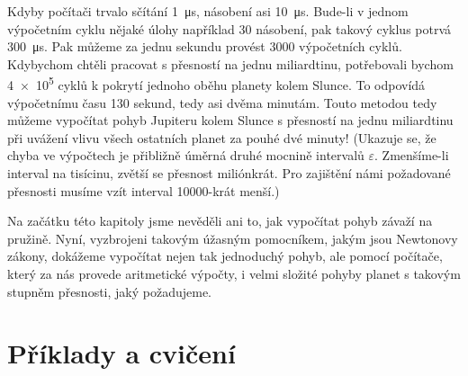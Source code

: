     Kdyby počítači trvalo sčítání \SI{1}{\us}, násobení asi \SI{10}{\us}. Bude-li v 
    jednom výpočetním cyklu nějaké úlohy například \num{30} násobení, pak takový cyklus potrvá 
    \SI{300}{\us}. Pak můžeme za jednu sekundu provést \num{3000} výpočetních cyklů. Kdybychom 
    chtěli pracovat s přesností na jednu miliardtinu, potřebovali bychom \num{4e5} cyklů k pokrytí 
    jednoho oběhu planety kolem Slunce. To odpovídá výpočetnímu času 130 sekund, tedy asi dvěma 
    minutám. Touto metodou tedy můžeme vypočítat pohyb Jupiteru kolem Slunce s přesností na 
    jednu miliardtinu při uvážení vlivu všech ostatních planet za pouhé dvé minuty! (Ukazuje se, že 
    chyba ve výpočtech je přibližně úměrná druhé mocnině intervalů \(\varepsilon\). Zmenšíme-li 
    interval na tisícinu, zvětší se přesnost miliónkrát. Pro zajištění námi požadované přesnosti 
    musíme vzít interval \num{10000}-krát menší.)
    
    Na začátku této kapitoly jsme nevěděli ani to, jak vypočítat pohyb závaží na pružině. Nyní, 
    vyzbrojeni takovým úžasným pomocníkem, jakým jsou Newtonovy zákony, dokážeme vypočítat nejen 
    tak jednoduchý pohyb, ale pomocí počítače, který za nás provede aritmetické výpočty, i velmi 
    složité pohyby planet s takovým stupněm přesnosti, jaký požadujeme.

  \newpage
  \section{Příklady a cvičení}
        

\printbibliography[heading=subbibliography]
